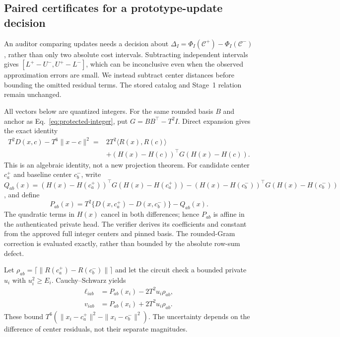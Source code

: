 \subsection{Paired certificates for a prototype-update decision}\label{sec:paired-method}
An auditor comparing updates needs a decision about
$\Delta_I=\Phi_I(\mathcal C^+)-\Phi_I(\mathcal C^-)$, rather than only two
absolute cost intervals. Subtracting independent intervals gives
$[L^+-U^-,U^+-L^-]$, which can be inconclusive even when the observed
approximation errors are small. We instead subtract center distances before
bounding the omitted residual terms. The stored catalog and Stage~1 relation
remain unchanged.

All vectors below are quantized integers. For the same rounded basis $B$ and
anchor as Eq.~\eqref{eq:protected-integer}, put $G=BB^\top-T^2I$. Direct expansion
gives the exact identity
\begin{equation}\label{eq:paired-identity}
\begin{split}
T^2D(x,c)-T^6\|x-c\|^2={}&2T^2\langle R(x),R(c)\rangle\\
&+(H(x)-H(c))^\top G(H(x)-H(c)).
\end{split}
\end{equation}
This is an algebraic identity, not a new projection theorem. For candidate
center $c_a^+$ and baseline center $c_b^-$, write
$Q_{ab}(x)=(H(x)-H(c_a^+))^\top G(H(x)-H(c_a^+))
-(H(x)-H(c_b^-))^\top G(H(x)-H(c_b^-))$, and define
\begin{equation}\label{eq:paired-affine}
P_{ab}(x)=T^2\{D(x,c_a^+)-D(x,c_b^-)\}-Q_{ab}(x).
\end{equation}
The quadratic terms in $H(x)$ cancel in both differences; hence $P_{ab}$ is
affine in the authenticated private head. The verifier derives its coefficients
and constant from the approved full integer centers and pinned basis. The
rounded-Gram correction is evaluated exactly, rather than bounded by the
absolute row-sum defect.

Let $\rho_{ab}=\lceil\|R(c_a^+)-R(c_b^-)\|\rceil$ and let the circuit check
a bounded private $u_i$ with $u_i^2\ge E_i$. Cauchy--Schwarz yields
\begin{align}
\ell_{iab}&=P_{ab}(x_i)-2T^2u_i\rho_{ab},\nonumber\\
v_{iab}&=P_{ab}(x_i)+2T^2u_i\rho_{ab}.\label{eq:paired-pair-bounds}
\end{align}
These bound $T^6(\|x_i-c_a^+\|^2-\|x_i-c_b^-\|^2)$. The uncertainty depends
on the difference of center residuals, not their separate magnitudes.

